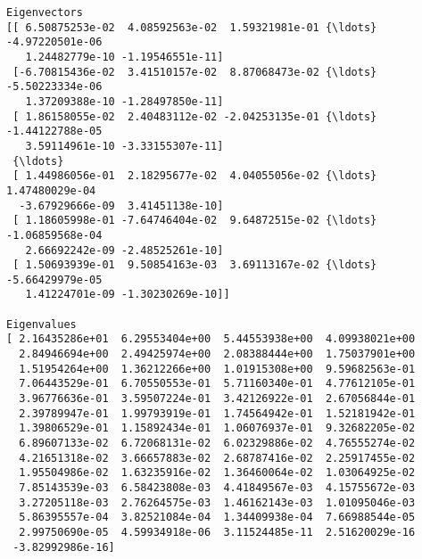 \documentclass[11pt]{article}
\begin{document}
    \begin{Verbatim}[commandchars=\\\{\}]
Eigenvectors 
[[ 6.50875253e-02  4.08592563e-02  1.59321981e-01 {\ldots} -4.97220501e-06
   1.24482779e-10 -1.19546551e-11]
 [-6.70815436e-02  3.41510157e-02  8.87068473e-02 {\ldots} -5.50223334e-06
   1.37209388e-10 -1.28497850e-11]
 [ 1.86158055e-02  2.40483112e-02 -2.04253135e-01 {\ldots} -1.44122788e-05
   3.59114961e-10 -3.33155307e-11]
 {\ldots}
 [ 1.44986056e-01  2.18295677e-02  4.04055056e-02 {\ldots}  1.47480029e-04
  -3.67929666e-09  3.41451138e-10]
 [ 1.18605998e-01 -7.64746404e-02  9.64872515e-02 {\ldots} -1.06859568e-04
   2.66692242e-09 -2.48525261e-10]
 [ 1.50693939e-01  9.50854163e-03  3.69113167e-02 {\ldots} -5.66429979e-05
   1.41224701e-09 -1.30230269e-10]]

Eigenvalues 
[ 2.16435286e+01  6.29553404e+00  5.44553938e+00  4.09938021e+00
  2.84946694e+00  2.49425974e+00  2.08388444e+00  1.75037901e+00
  1.51954264e+00  1.36212266e+00  1.01915308e+00  9.59682563e-01
  7.06443529e-01  6.70550553e-01  5.71160340e-01  4.77612105e-01
  3.96776636e-01  3.59507224e-01  3.42126922e-01  2.67056844e-01
  2.39789947e-01  1.99793919e-01  1.74564942e-01  1.52181942e-01
  1.39806529e-01  1.15892434e-01  1.06076937e-01  9.32682205e-02
  6.89607133e-02  6.72068131e-02  6.02329886e-02  4.76555274e-02
  4.21651318e-02  3.66657883e-02  2.68787416e-02  2.25917455e-02
  1.95504986e-02  1.63235916e-02  1.36460064e-02  1.03064925e-02
  7.85143539e-03  6.58423808e-03  4.41849567e-03  4.15755672e-03
  3.27205118e-03  2.76264575e-03  1.46162143e-03  1.01095046e-03
  5.86395557e-04  3.82521084e-04  1.34409938e-04  7.66988544e-05
  2.99750690e-05  4.59934918e-06  3.11524485e-11  2.51620029e-16
 -3.82992986e-16]

    \end{Verbatim}
\end{document}
